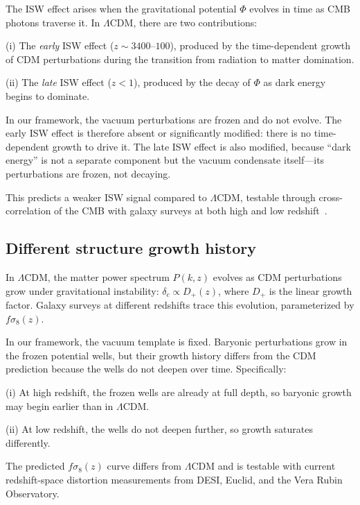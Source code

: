\documentclass[12pt, a4paper]{article}
\begin{document}
The ISW effect arises when the gravitational potential $\Phi$ evolves in time as CMB photons traverse it. In $\Lambda$CDM, there are two contributions:

(i) The \emph{early} ISW effect ($z \sim 3400$--$100$), produced by the time-dependent growth of CDM perturbations during the transition from radiation to matter domination.

(ii) The \emph{late} ISW effect ($z < 1$), produced by the decay of $\Phi$ as dark energy begins to dominate.

In our framework, the vacuum perturbations are frozen and do not evolve. The early ISW effect is therefore absent or significantly modified: there is no time-dependent growth to drive it. The late ISW effect is also modified, because ``dark energy'' is not a separate component but the vacuum condensate itself---its perturbations are frozen, not decaying.

This predicts a weaker ISW signal compared to $\Lambda$CDM, testable through cross-correlation of the CMB with galaxy surveys at both high and low redshift~\cite{planck_isw_2016}.

\newpage
\subsection{Different structure growth history}

In $\Lambda$CDM, the matter power spectrum $P(k,z)$ evolves as CDM perturbations grow under gravitational instability: $\delta_c \propto D_+(z)$, where $D_+$ is the linear growth factor. Galaxy surveys at different redshifts trace this evolution, parameterized by $f\sigma_8(z)$.

In our framework, the vacuum template is fixed. Baryonic perturbations grow in the frozen potential wells, but their growth history differs from the CDM prediction because the wells do not deepen over time. Specifically:

(i) At high redshift, the frozen wells are already at full depth, so baryonic growth may begin earlier than in $\Lambda$CDM.

(ii) At low redshift, the wells do not deepen further, so growth saturates differently.

The predicted $f\sigma_8(z)$ curve differs from $\Lambda$CDM and is testable with current redshift-space distortion measurements from DESI, Euclid, and the Vera Rubin Observatory.

\end{document}
